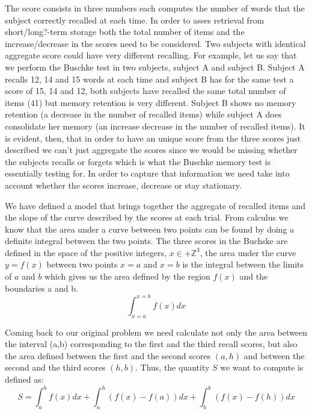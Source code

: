 \documentclass[11pt]{article}
\theoremstyle{definition}
\theoremstyle{remark}
\begin{document}
The score consists in three numbers each computes the number of words that the subject correctly recalled at each time. In order to asses retrieval from short/long?-term storage both the total number of items and the increase/decrease in the scores need to be considered. Two subjects with identical aggregate score could have very different recalling. For example, let us say that we perform the Buschke test in two subjects, subject A and subject B. Subject A recalls 12, 14 and 15 words at each time and subject B has for the same test a score of 15, 14 and 12, both subjects have recalled the same total number of items (41) but memory retention is very different. Subject B shows no memory retention (a decrease in the number of recalled items) while subject A does consolidate her memory (an increase decrease in the number of recalled items).
It is evident, then, that in order to have an unique score from the three scores just described we can't just aggregate the scores since we would be missing whether the subjects recalls or forgets which is what the Buschke memory test is essentially testing for. In order to capture that information we need take into account whether the scores increase, decrease or stay stationary.

We have defined a model that brings together the aggregate of recalled items and the slope of the curve described by the scores at each trial. 
From calculus we know that the area under a curve between two points can be found by doing a definite integral between the two points. 
The three scores in the Buchske are defined in the space of the positive integers, $x \in +\mathbb{Z}^3$, the area under the curve $y = f(x)$ between two points $x=a$ and $x=b$ is the integral between the limits of $a$ and $b$ which gives us the area defined by the region $f(x)$ and the boundaries a and b.
\begin{equation}
\int_{x=a}^{x=b}f(x)dx
\label{eq:defint}
\end{equation}
 
Coming back to our original problem we need calculate not only the area between the interval (a,b) corresponding to the first and the third recall scores, but also the area defined between the first and the second scores $(a,h)$ and between the second and the third scores $(h,b)$.  
Thus, the quantity $S$ we want to compute is defined as:
\begin{equation}
S = \int_{a}^{b}f(x)dx + \int_{a}^{h}(f(x) - f(a))dx + \int_{h}^{b}(f(x)-f(h))dx
\label{eq:buchske}
\end{equation}
\end{document}
